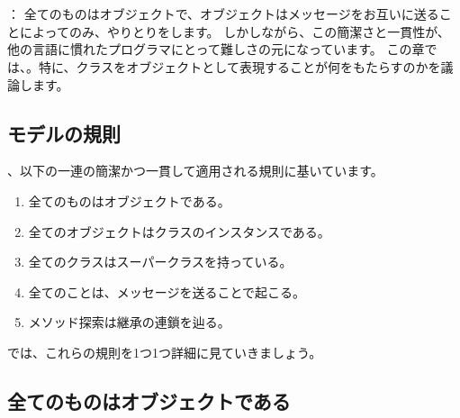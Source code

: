 \documentclass[a4paper,10pt,twoside]{book}
\begin{document}
	\renewcommand{\nnbb}[2]{} %
	\sloppy
\fi
\chapter{}

： 全てのものはオブジェクトで、オブジェクトはメッセージをお互いに送ることによってのみ、やりとりをします。
しかしながら、この簡潔さと一貫性が、他の言語に慣れたプログラマにとって難しさの元になっています。
この章では、。特に、クラスをオブジェクトとして表現することが何をもたらすのかを議論します。

\section{モデルの規則}

、以下の一連の簡潔かつ一貫して適用される規則に基いています。

\begin{enumerate}[label={\textbf{Rule \arabic{*}}.}, ref={Rule \arabic{*}}, leftmargin=*]
\item{} 
	全てのものはオブジェクトである。

\item{} 
	全てのオブジェクトはクラスのインスタンスである。

\item{}  
	全てのクラスはスーパークラスを持っている。

\item{}  
	全てのことは、メッセージを送ることで起こる。

\item{}  
	メソッド探索は継承の連鎖を辿る。

\end{enumerate}

\noindent
では、これらの規則を1つ1つ詳細に見ていきましょう。


\section{全てのものはオブジェクトである}
\end{document}

